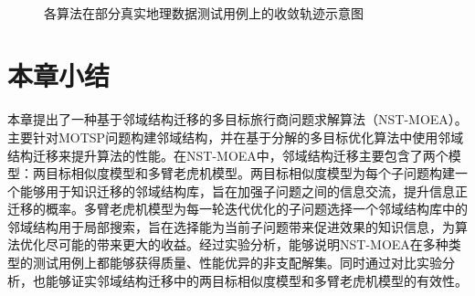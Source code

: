 \begin{figure}[!h]
     \quad
    \\
     \quad
    \caption[各算法在部分真实地理数据测试用例上的收敛轨迹示意图]{各算法在部分真实地理数据测试用例上的收敛轨迹示意图}
    \label{fig:各算法在部分真实地理数据测试用例上的收敛轨迹示意图}
\end{figure}

\section{本章小结}
\label{sec:NST:本章小结}
本章提出了一种基于邻域结构迁移的多目标旅行商问题求解算法（NST-MOEA）。主要针对MOTSP问题构建邻域结构，并在基于分解的多目标优化算法中使用邻域结构迁移来提升算法的性能。在NST-MOEA中，邻域结构迁移主要包含了两个模型：两目标相似度模型和多臂老虎机模型。两目标相似度模型为每个子问题构建一个能够用于知识迁移的邻域结构库，旨在加强子问题之间的信息交流，提升信息正迁移的概率。多臂老虎机模型为每一轮迭代优化的子问题选择一个邻域结构库中的邻域结构用于局部搜索，旨在选择能为当前子问题带来促进效果的知识信息，为算法优化尽可能的带来更大的收益。经过实验分析，能够说明NST-MOEA在多种类型的测试用例上都能够获得质量、性能优异的非支配解集。同时通过对比实验分析，也能够证实邻域结构迁移中的两目标相似度模型和多臂老虎机模型的有效性。